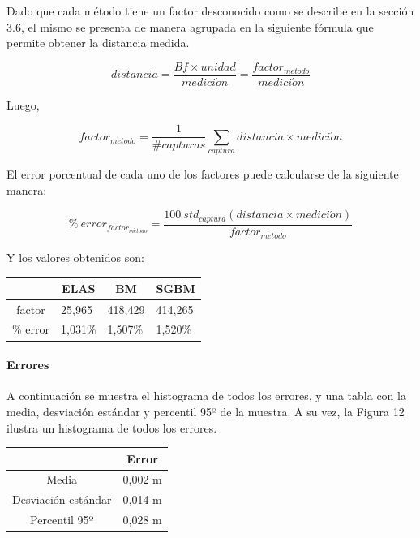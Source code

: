 \documentclass[11pt,a4paper,titlepage]{article}
\newcommand{\Figure}[1]{Figura #1}
\begin{document}
Dado que cada método tiene un factor desconocido como se describe en la sección 3.6, el mismo se presenta de manera agrupada en la siguiente fórmula que permite obtener la distancia medida.

\[
    distancia = \frac{Bf \times unidad}{medici\acute{o}n} = \frac{ factor_{m\acute{e}todo} }{ medici\acute{o}n }
\]

Luego,

\[
	factor_{m\acute{e}todo} = \frac{1}{\#capturas} \sum_{captura} {distancia \times medici\acute{o}n}
\]

El error porcentual de cada uno de los factores puede calcularse de la siguiente manera:

\[
	{\%\ error}_{factor_{m\acute{e}todo}} = \frac{100 \  std_{captura}(distancia \times medici\acute{o}n)}{factor_{m\acute{e}todo}}
\]

Y los valores obtenidos son:

\begin{table}[!ht]
\centering
\begin{tabular}{@{}clll@{}}
       & \multicolumn{1}{c}{ELAS} & \multicolumn{1}{c}{BM} & \multicolumn{1}{c}{SGBM} \\ \midrule
factor & 25,965 & 418,429 & 414,265 \\ \midrule
\% error & 1,031\% & 1,507\% & 1,520\% \\ \midrule
\end{tabular}
\end{table}

\paragraph{Errores}
\hfill \break
A continuación se muestra el histograma de todos los errores, y una tabla con la media, desviación estándar y percentil 95º de la muestra. A su vez, la \Figure{12} ilustra un histograma de todos los errores.

\begin{table}[!ht]
\centering
\begin{tabular}{@{}cl@{}}
       & \multicolumn{1}{c}{Error} \\ \midrule
Media & 0,002 m \\ \midrule
Desviación estándar & 0,014 m \\ \midrule
Percentil 95º & 0,028 m \\ \midrule
\end{tabular}
\end{table}
\end{document}
